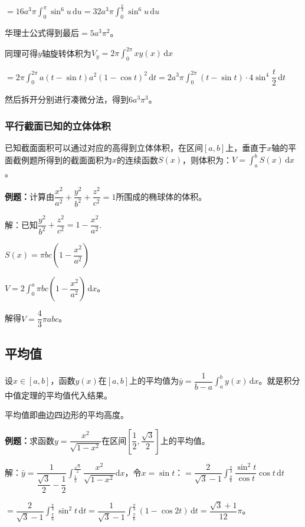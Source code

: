 \documentclass[UTF8, 12pt]{ctexart}
\begin{document}
$=16a^3\pi\int_0^\pi\sin^6u\,\textrm{d}u=32a^3\pi\int_0^{\frac{\pi}{2}}\sin^6u\,\textrm{d}u$

华理士公式得到最后$=5a^3\pi^2$。

同理可得$y$轴旋转体积为$V_y=2\pi\int_0^{2\pi}xy(x)\,\textrm{d}x$

$=2\pi\int_0^{2\pi}a(t-\sin t)a^2(1-\cos t)^2\,\textrm{d}t=2a^3\pi\int_0^{2\pi}(t-\sin t)\cdot 4\sin^4\dfrac{t}{2}\,\textrm{d}t$

然后拆开分别进行凑微分法，得到$6a^3\pi^3$。

\subsubsection{平行截面已知的立体体积}

已知截面面积可以通过对应的高得到立体体积，在区间$[a,b]$上，垂直于$x$轴的平面截例题所得到的截面面积为$x$的连续函数$S(x)$，则体积为：$V=\int_a^bS(x)\,\textrm{d}x$。

\textbf{例题：}计算由$\dfrac{x^2}{a^2}+\dfrac{y^2}{b^2}+\dfrac{z^2}{c^2}=1$所围成的椭球体的体积。

解：已知$\dfrac{y^2}{b^2}+\dfrac{z^2}{c^2}=1-\dfrac{x^2}{a^2}$.

$S(x)=\pi bc\left(1-\dfrac{x^2}{a^2}\right)$

$V=2\int_0^a\pi bc\left(1-\dfrac{x^2}{a^2}\right)\,\textrm{d}x$。

解得$V=\dfrac{4}{3}\pi abc$。

\subsection{平均值}

设$x\in[a,b]$，函数$y(x)$在$[a,b]$上的平均值为$\bar{y}=\dfrac{1}{b-a}\int_a^by(x)\,\textrm{d}x$。就是积分中值定理的平均值代入结果。

平均值即曲边四边形的平均高度。

\textbf{例题：}求函数$y=\dfrac{x^2}{\sqrt{1-x^2}}$在区间$\left[\dfrac{1}{2},\dfrac{\sqrt{3}}{2}\right]$上的平均值。

解：$\bar{y}=\dfrac{1}{\dfrac{\sqrt{3}}{2}-\dfrac{1}{2}}\displaystyle{\int_\frac{1}{2}^\frac{\sqrt{3}}{2}\dfrac{x^2}{\sqrt{1-x^2}}\textrm{d}x}$，令$x=\sin t$：$=\dfrac{2}{\sqrt{3}-1}\displaystyle{\int_\frac{\pi}{6}^\frac{\pi}{3}\dfrac{\sin^2t}{\cos t}\cos t\,\textrm{d}t}$ \medskip

$=\dfrac{2}{\sqrt{3}-1}\int_\frac{\pi}{6}^\frac{\pi}{3}\sin^2t\,\textrm{d}t=\dfrac{1}{\sqrt{3}-1}\int_\frac{\pi}{6}^\frac{\pi}{3}(1-\cos2t)\,\textrm{d}t=\dfrac{\sqrt{3}+1}{12}\pi$。
\end{document}
